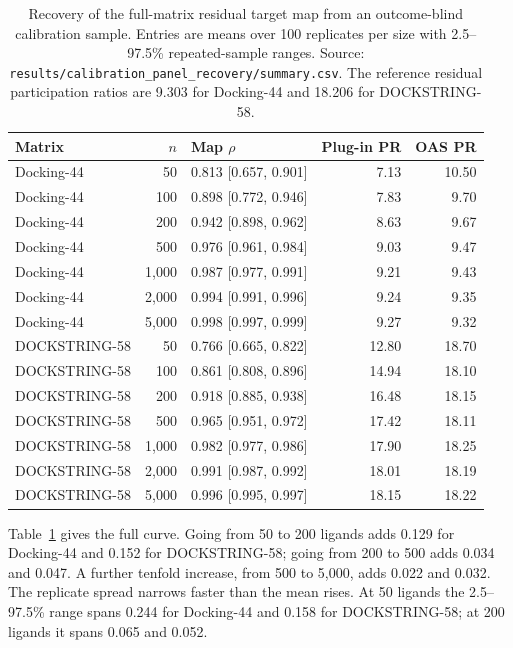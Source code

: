 \begin{table}[htbp]
\centering
\caption{Recovery of the full-matrix residual target map from an outcome-blind calibration
sample. Entries are means over 100 replicates per size with 2.5--97.5\% repeated-sample ranges.
Source: \texttt{results/calibration\_panel\_recovery/summary.csv}. The reference residual
participation ratios are 9.303 for Docking-44 and 18.206 for DOCKSTRING-58.}
\label{tab:s5curve}
\small
\begin{tabular}{lrlrr}
\toprule
Matrix & $n$ & Map $\rho$ & Plug-in PR & OAS PR \\
\midrule
Docking-44 & 50 & 0.813 [0.657, 0.901] & 7.13 & 10.50 \\
Docking-44 & 100 & 0.898 [0.772, 0.946] & 7.83 & 9.70 \\
Docking-44 & 200 & 0.942 [0.898, 0.962] & 8.63 & 9.67 \\
Docking-44 & 500 & 0.976 [0.961, 0.984] & 9.03 & 9.47 \\
Docking-44 & 1{,}000 & 0.987 [0.977, 0.991] & 9.21 & 9.43 \\
Docking-44 & 2{,}000 & 0.994 [0.991, 0.996] & 9.24 & 9.35 \\
Docking-44 & 5{,}000 & 0.998 [0.997, 0.999] & 9.27 & 9.32 \\
\midrule
DOCKSTRING-58 & 50 & 0.766 [0.665, 0.822] & 12.80 & 18.70 \\
DOCKSTRING-58 & 100 & 0.861 [0.808, 0.896] & 14.94 & 18.10 \\
DOCKSTRING-58 & 200 & 0.918 [0.885, 0.938] & 16.48 & 18.15 \\
DOCKSTRING-58 & 500 & 0.965 [0.951, 0.972] & 17.42 & 18.11 \\
DOCKSTRING-58 & 1{,}000 & 0.982 [0.977, 0.986] & 17.90 & 18.25 \\
DOCKSTRING-58 & 2{,}000 & 0.991 [0.987, 0.992] & 18.01 & 18.19 \\
DOCKSTRING-58 & 5{,}000 & 0.996 [0.995, 0.997] & 18.15 & 18.22 \\
\bottomrule
\end{tabular}
\end{table}

Table~\ref{tab:s5curve} gives the full curve. Going from 50 to 200 ligands adds 0.129 for
Docking-44 and 0.152 for DOCKSTRING-58; going from 200 to 500 adds 0.034 and 0.047. A further
tenfold increase, from 500 to 5{,}000, adds 0.022 and 0.032. The replicate spread narrows faster
than the mean rises. At 50 ligands the 2.5--97.5\% range spans 0.244 for Docking-44 and 0.158 for
DOCKSTRING-58; at 200 ligands it spans 0.065 and 0.052.

